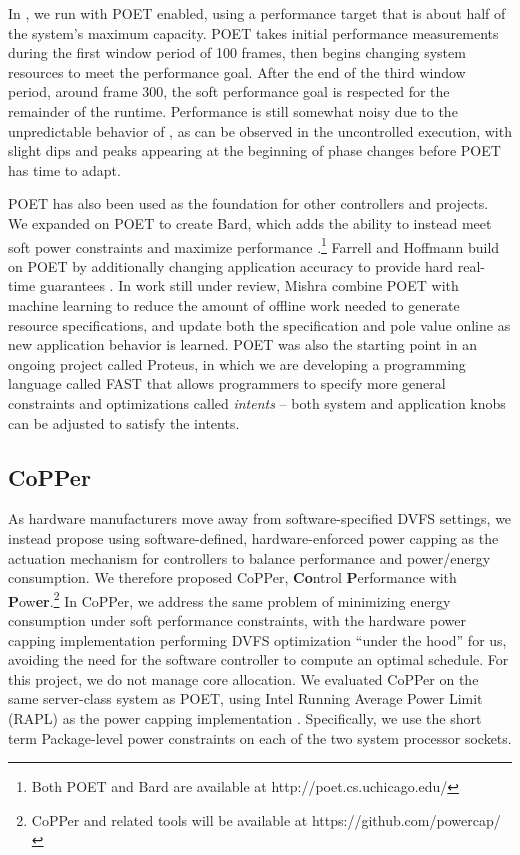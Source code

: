 In , we run with POET enabled, using a performance target that is about half of the system's maximum capacity.
POET takes initial performance measurements during the first window period of 100 frames, then begins changing system resources to meet the performance goal.
After the end of the third window period, around frame 300, the soft performance goal is respected for the remainder of the runtime.
Performance is still somewhat noisy due to the unpredictable behavior of , as can be observed in the uncontrolled execution, with slight dips and peaks appearing at the beginning of phase changes before POET has time to adapt.

POET has also been used as the foundation for other controllers and projects.
We expanded on POET to create Bard, which adds the ability to instead meet soft power constraints and maximize performance \cite{Bard}.\footnote{Both POET and Bard are available at http://poet.cs.uchicago.edu/}
Farrell and Hoffmann build on POET by additionally changing application accuracy to provide hard real-time guarantees \cite{meantime}.
In work still under review, Mishra \etal combine POET with machine learning to reduce the amount of offline work needed to generate resource specifications, and update both the specification and pole value online as new application behavior is learned.
POET was also the starting point in an ongoing project called Proteus, in which we are developing a programming language called FAST that allows programmers to specify more general constraints and optimizations called \emph{intents} -- both system and application knobs can be adjusted to satisfy the intents.


\subsection{CoPPer}

As hardware manufacturers move away from software-specified DVFS settings, we instead propose using software-defined, hardware-enforced power capping as the actuation mechanism for controllers to balance performance and power/energy consumption.
We therefore proposed CoPPer, \textbf{Co}ntrol \textbf{P}erformance with \textbf{P}ow\textbf{er}.\footnote{CoPPer and related tools will be available at https://github.com/powercap/}
In CoPPer, we address the same problem of minimizing energy consumption under soft performance constraints, with the hardware power capping implementation performing DVFS optimization ``under the hood'' for us, avoiding the need for the software controller to compute an optimal schedule.
For this project, we do not manage core allocation.
We evaluated CoPPer on the same server-class system as POET, using Intel Running Average Power Limit (RAPL) as the power capping implementation \cite{RAPL}.
Specifically, we use the short term Package-level power constraints on each of the two system processor sockets.

